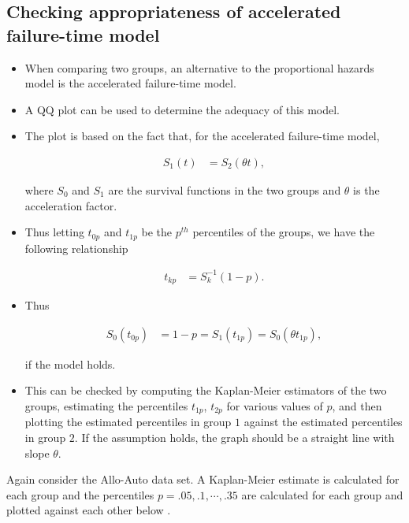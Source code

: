 \documentclass[10pt]{article}\usepackage[]{graphicx}\usepackage[]{xcolor}
\theoremstyle{definition}
\numberwithin{equation}{subsection}
\numberwithin{figure}{section}
\numberwithin{table}{subsection}
\numberwithin{Report}{section}
\numberwithin{Example}{subsection}
\begin{document}
\newpage

\subsection{Checking appropriateness of accelerated failure-time model}
\begin{itemize}
\item When comparing two groups, an alternative to the proportional hazards model is the accelerated failure-time model.
\item A QQ plot can be used to determine the adequacy of this model.
\item The plot is based on the fact that, for the accelerated failure-time model,

\begin{align*}
S_{1}(t) & =S_{2}(\theta t),
\end{align*}

where $S_{0}$ and $S_{1}$ are the survival functions in the two
groups and $\theta$ is the acceleration factor.

\item Thus letting $t_{0p}$ and $t_{1p}$ be the $p^{th}$ percentiles
of the groups, we have the following relationship


\begin{align*}
t_{kp} & =S_{k}^{-1}(1-p).
\end{align*}


\item Thus 


\begin{align*}
S_{0}(t_{0p}) & =1-p=S_{1}(t_{1p})=S_{0}(\theta t_{1p}),
\end{align*}



if the model holds.

\item This can be checked by computing the Kaplan-Meier estimators of the
two groups, estimating the percentiles $t_{1p}$, $t_{2p}$ for various
values of $p$, and then plotting the estimated percentiles in group
$1$ against the estimated percentiles in group $2$. If the assumption
holds, the graph should be a straight line with slope $\theta$.\end{itemize}


\noindent Again consider the Allo-Auto data set. A Kaplan-Meier estimate
is calculated for each group and the percentiles $p=.05,.1,\cdots,.35$
are calculated for each group and plotted against each other below
.
\end{document}

